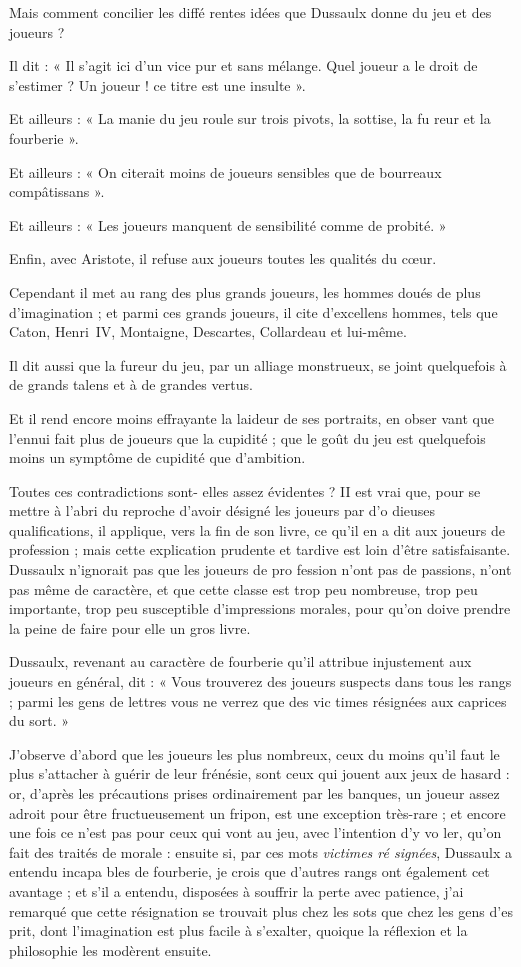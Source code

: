 Mais comment concilier les diffé%
rentes idées que Dussaulx donne du
jeu et des joueurs ?

Il dit : « Il s'agit ici d'un vice pur
et sans mélange. Quel joueur a le
droit de s'estimer ? Un joueur ! ce
titre est une insulte ».

Et ailleurs : « La manie du jeu roule
sur trois pivots, la sottise, la fu%
reur et la fourberie ».

Et ailleurs : « On citerait moins de
joueurs sensibles que de bourreaux
compâtissans ».

Et ailleurs : « Les joueurs manquent
de sensibilité comme de probité. »

Enfin, avec Aristote, il refuse aux
joueurs toutes les qualités du cœur.

Cependant il met au rang des plus
grands joueurs, les hommes doués
de plus d'imagination ; et parmi ces
grands joueurs, il cite d'excellens
hommes, tels que Caton, Henri~IV,
Montaigne, Descartes, Collardeau et
lui-même.

Il dit aussi que la fureur du jeu,
par un alliage monstrueux, se joint
quelquefois à de grands talens et à
de grandes vertus.

Et il rend encore moins effrayante
la laideur de ses portraits, en obser%
vant que l'ennui fait plus de joueurs
que la cupidité ; que le goût du jeu
est quelquefois moins un symptôme
de cupidité que d'ambition.

Toutes ces contradictions sont-%
elles assez évidentes ? II est vrai que,
pour se mettre à l'abri du reproche
d'avoir désigné les joueurs par d'o%
dieuses qualifications, il applique,
vers la fin de son livre, ce qu'il en a
dit aux joueurs de profession ; mais
cette explication prudente et tardive
est loin d'être satisfaisante. Dussaulx
n'ignorait pas que les joueurs de pro%
fession n'ont pas de passions, n'ont
pas même de caractère, et que cette
classe est trop peu nombreuse, trop
peu importante, trop peu susceptible
d'impressions morales, pour qu'on
doive prendre la peine de faire pour
elle un gros livre.

Dussaulx, revenant au caractère de
fourberie qu'il attribue injustement
aux joueurs en général, dit : « Vous
trouverez des joueurs suspects dans
tous les rangs ; parmi les gens de
lettres vous ne verrez que des vic%
times résignées aux caprices du
sort. »

J'observe d'abord que les joueurs
les plus nombreux, ceux du moins
qu'il faut le plus s'attacher à guérir
de leur frénésie, sont ceux qui jouent
aux jeux de hasard : or, d'après les
précautions prises ordinairement par
les banques, un joueur assez adroit
pour être fructueusement un fripon,
est une exception très-rare ; et encore
une fois ce n'est pas pour ceux qui
vont au jeu, avec l'intention d'y vo%
ler, qu'on fait des traités de morale :
ensuite si, par ces mots \emph{victimes ré%
signées}, Dussaulx a entendu incapa%
bles de fourberie, je crois que d'autres
rangs ont également cet avantage ;
et s'il a entendu, disposées à souffrir
la perte avec patience, j'ai remarqué
que cette résignation se trouvait plus
chez les sots que chez les gens d'es%
prit, dont l'imagination est plus facile
à s'exalter, quoique la réflexion et la
philosophie les modèrent ensuite.

